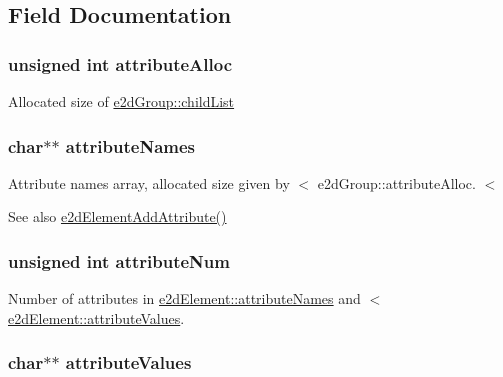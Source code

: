\subsection{Field Documentation}
\hypertarget{structe2d_element_a70d94929e3789bf7c019c939b0084985}{
\subsubsection[{attribute\-Alloc}]{\setlength{\rightskip}{0pt plus 5cm}unsigned int {\bf attribute\-Alloc}}}\label{structe2d_element_a70d94929e3789bf7c019c939b0084985}
Allocated size of \hyperlink{structe2d_group_a55f6dde874716dc99dcd270fc0999a01}{e2d\-Group\-::child\-List} \hypertarget{structe2d_element_af9b5d9dbbf270b6f92a3ee66ce1b47ac}{
\subsubsection[{attribute\-Names}]{\setlength{\rightskip}{0pt plus 5cm}char$\ast$$\ast$ {\bf attribute\-Names}}}\label{structe2d_element_af9b5d9dbbf270b6f92a3ee66ce1b47ac}
Attribute names array, allocated size given by $<$ e2d\-Group\-::attribute\-Alloc. $<$ \begin{DoxySeeAlso}{See also}
\hyperlink{group__e2d_element_ga5cfa0a343d3dd1a30b0addc4ec6e7f88}{e2d\-Element\-Add\-Attribute()} 
\end{DoxySeeAlso}
\hypertarget{structe2d_element_a836181401227a3ca42da026a8d35e730}{
\subsubsection[{attribute\-Num}]{\setlength{\rightskip}{0pt plus 5cm}unsigned int {\bf attribute\-Num}}}\label{structe2d_element_a836181401227a3ca42da026a8d35e730}
Number of attributes in \hyperlink{structe2d_element_af9b5d9dbbf270b6f92a3ee66ce1b47ac}{e2d\-Element\-::attribute\-Names} and $<$ \hyperlink{structe2d_element_ae8591ff93c366b4d66817a70f2d9f33e}{e2d\-Element\-::attribute\-Values}. \hypertarget{structe2d_element_ae8591ff93c366b4d66817a70f2d9f33e}{
\subsubsection[{attribute\-Values}]{\setlength{\rightskip}{0pt plus 5cm}char$\ast$$\ast$ {\bf attribute\-Values}}}\label{structe2d_element_ae8591ff93c366b4d66817a70f2d9f33e}

